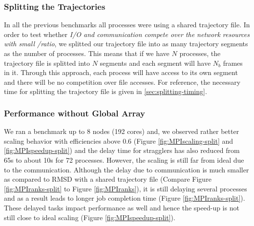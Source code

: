 \subsubsection{Splitting the Trajectories}
\label{splitting-traj}
In all the previous benchmarks all processes were using a shared trajectory file.
In order to test whether \emph{I/O and communication compete over the network resources with small \tcomp/\tIO ratio}, we splitted our trajectory file into as many trajectory segments as the number of processes.
This means that if we have $N$ processes, the trajectory file is splitted into $N$ segments and each segment will have $N_{b}$ frames in it. 
Through this approach, each process will have access to its own segment and there will be no competition over file accesses. 
For reference, the necessary time for splitting the trajectory file is given in \ref{sec:splitting-timing}.

\subsubsection*{Performance without Global Array}
We ran a benchmark up to 8 nodes (192 cores) and, we observed rather better scaling behavior with efficiencies above 0.6 (Figure \ref{fig:MPIscaling-split} and \ref{fig:MPIspeedup-split}) and the delay time for stragglers has also reduced from 65s to about 10s for 72 processes. 
However, the scaling is still far from ideal due to the communication. 
Although the delay due to communication is much smaller as compared to RMSD with a shared trajectory file (Compare Figure \ref{fig:MPIranks-split} to Figure \ref{fig:MPIranks}), it is still delaying several processes and as a result leads to longer job completion time (Figure \ref{fig:MPIranks-split}). 
These delayed tasks impact performance as well and hence the speed-up is not still close to ideal scaling (Figure \ref{fig:MPIspeedup-split}).

